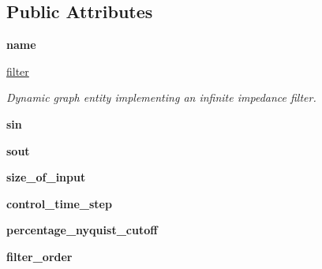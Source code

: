 \subsection*{Public Attributes}
\begin{DoxyCompactItemize}
\item 
{\bfseries name}\hypertarget{classpython_1_1dg__tools_1_1filter_1_1ButterWorthFilter_a3c84edcefe0f321c7f24a5169d95bc86}{}\label{classpython_1_1dg__tools_1_1filter_1_1ButterWorthFilter_a3c84edcefe0f321c7f24a5169d95bc86}

\item 
\hyperlink{classpython_1_1dg__tools_1_1filter_1_1ButterWorthFilter_aaa37fb9c14becc324528c1a5eb7a0a86}{filter}
\begin{DoxyCompactList}\small\item\em Dynamic graph entity implementing an infinite impedance filter. \end{DoxyCompactList}\item 
{\bfseries sin}\hypertarget{classpython_1_1dg__tools_1_1filter_1_1ButterWorthFilter_a752671c3f15b39de6adf9cc0b3d44b33}{}\label{classpython_1_1dg__tools_1_1filter_1_1ButterWorthFilter_a752671c3f15b39de6adf9cc0b3d44b33}

\item 
{\bfseries sout}\hypertarget{classpython_1_1dg__tools_1_1filter_1_1ButterWorthFilter_ad658ec88660f576c1883ebd797112c47}{}\label{classpython_1_1dg__tools_1_1filter_1_1ButterWorthFilter_ad658ec88660f576c1883ebd797112c47}

\item 
{\bfseries size\+\_\+of\+\_\+input}\hypertarget{classpython_1_1dg__tools_1_1filter_1_1ButterWorthFilter_aac00507043d3d42798c2d9cd82fc48c9}{}\label{classpython_1_1dg__tools_1_1filter_1_1ButterWorthFilter_aac00507043d3d42798c2d9cd82fc48c9}

\item 
{\bfseries control\+\_\+time\+\_\+step}\hypertarget{classpython_1_1dg__tools_1_1filter_1_1ButterWorthFilter_a43f66675fb652ea597949603ffe6036f}{}\label{classpython_1_1dg__tools_1_1filter_1_1ButterWorthFilter_a43f66675fb652ea597949603ffe6036f}

\item 
{\bfseries percentage\+\_\+nyquist\+\_\+cutoff}\hypertarget{classpython_1_1dg__tools_1_1filter_1_1ButterWorthFilter_a678f80fb063d8985ebe597ef92965a59}{}\label{classpython_1_1dg__tools_1_1filter_1_1ButterWorthFilter_a678f80fb063d8985ebe597ef92965a59}

\item 
{\bfseries filter\+\_\+order}\hypertarget{classpython_1_1dg__tools_1_1filter_1_1ButterWorthFilter_afcf4eb37f5e300fbb14fa9094c5f36a4}{}\label{classpython_1_1dg__tools_1_1filter_1_1ButterWorthFilter_afcf4eb37f5e300fbb14fa9094c5f36a4}


\end{DoxyCompactItemize}
